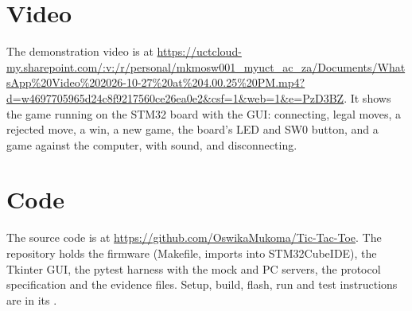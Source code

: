\section{Video}
\label{sec:video}

The demonstration video is at \url{https://uctcloud-my.sharepoint.com/:v:/r/personal/mkmosw001_myuct_ac_za/Documents/WhatsApp\%20Video\%202026-10-27\%20at\%204.00.25\%20PM.mp4?d=w4697705965d24c8f9217560ce26ea0e2&csf=1&web=1&e=PzD3BZ}. It shows the game running on the STM32 board with the GUI: connecting, legal moves, a rejected move, a win, a new game, the board's LED and SW0 button, and a game against the computer, with sound, and disconnecting.

\section{Code}
\label{sec:code}

The source code is at \url{https://github.com/OswikaMukoma/Tic-Tac-Toe}. The repository holds the firmware (Makefile, imports into STM32CubeIDE), the Tkinter GUI, the pytest harness with the mock and PC servers, the protocol specification and the evidence files. Setup, build, flash, run and test instructions are in its .
